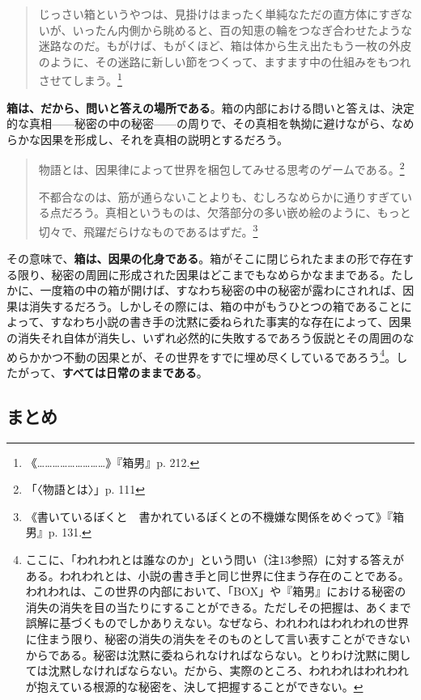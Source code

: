 \documentclass[a4paper]{jsarticle}
\begin{document}
\begin{quotation}
じっさい箱というやつは、見掛けはまったく単純なただの直方体にすぎないが、いったん内側から眺めると、百の知恵の輪をつなぎ合わせたような迷路なのだ。もがけば、もがくほど、箱は体から生え出たもう一枚の外皮のように、その迷路に新しい節をつくって、ますます中の仕組みをもつれさせてしまう。\footnote{《………………………》『箱男』p. 212.}	
\end{quotation}

\textbf{箱は、だから、問いと答えの場所である}。箱の内部における問いと答えは、決定的な真相------秘密の中の秘密------の周りで、その真相を執拗に避けながら、なめらかな因果を形成し、それを真相の説明とするだろう。

\begin{quotation}
物語とは、因果律によって世界を梱包してみせる思考のゲームである。\footnote{「〈物語とは〉」p. 111}

不都合なのは、筋が通らないことよりも、むしろなめらかに通りすぎている点だろう。真相というものは、欠落部分の多い嵌め絵のように、もっと切々で、飛躍だらけなものであるはずだ。\footnote{《書いているぼくと　書かれているぼくとの不機嫌な関係をめぐって》『箱男』p. 131.}
\end{quotation}

その意味で、\textbf{箱は、因果の化身である}。箱がそこに閉じられたままの形で存在する限り、秘密の周囲に形成された因果はどこまでもなめらかなままである。たしかに、一度箱の中の箱が開けば、すなわち秘密の中の秘密が露わにされれば、因果は消失するだろう。しかしその際には、箱の中がもうひとつの箱であることによって、すなわち小説の書き手の沈黙に委ねられた事実的な存在によって、因果の消失それ自体が消失し、いずれ必然的に失敗するであろう仮説とその周囲のなめらかかつ不動の因果とが、その世界をすでに埋め尽くしているであろう\footnote{ここに、「われわれとは誰なのか」という問い（注13参照）に対する答えがある。われわれとは、小説の書き手と同じ世界に住まう存在のことである。われわれは、この世界の内部において、「BOX」や『箱男』における秘密の消失の消失を目の当たりにすることができる。ただしその把握は、あくまで誤解に基づくものでしかありえない。なぜなら、われわれはわれわれの世界に住まう限り、秘密の消失の消失をそのものとして言い表すことができないからである。秘密は沈黙に委ねられなければならない。とりわけ沈黙に関しては沈黙しなければならない。だから、実際のところ、われわれはわれわれが抱えている根源的な秘密を、決して把握することができない。}。したがって、\textbf{すべては日常のままである}。

\subsection*{まとめ}
\end{document}
